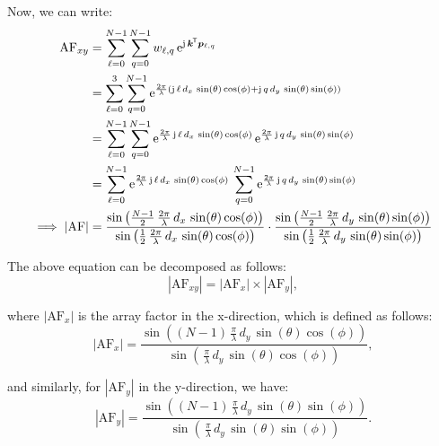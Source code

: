 \documentclass[12pt,onecolumn,a4paper]{article}
\newcommand*{\transpose}{{\mkern-1.5mu\mathsf{T}}}
\begin{document}
	Now, we can write:
\begin{align}
	\text{AF}_{xy} &= \sum_{\ell=0}^{N-1} \sum_{q=0}^{N-1} w_{\ell,q} \, \mathrm{e}^{\mathrm{j} \, \bm{k}^\transpose \bm{p}_{\ell,q}}\\
	&= \sum_{\ell=0}^{3} \sum_{q=0}^{N-1} \mathrm{e}^{\frac{2\pi}{\lambda} \left( \mathrm{j} \, \ell \, d_x \, \sin(\theta) \cos(\phi) + \mathrm{j} \, q \, d_y \, \sin(\theta) \sin(\phi) \right)} \\
	&= \sum_{\ell=0}^{N-1} \sum_{q=0}^{N-1} \mathrm{e}^{\frac{2\pi}{\lambda} \, \mathrm{j} \, \ell \, d_x \, \sin(\theta) \cos(\phi)} \, \mathrm{e}^{\frac{2\pi}{\lambda} \, \mathrm{j} \, q \, d_y \, \sin(\theta) \sin(\phi)} \\
	&= \sum_{\ell=0}^{N-1} \mathrm{e}^{\frac{2\pi}{\lambda} \, \mathrm{j} \, \ell \, d_x \, \sin(\theta) \cos(\phi)} \, \sum_{q=0}^{N-1} \mathrm{e}^{\frac{2\pi}{\lambda} \, \mathrm{j} \, q \, d_y \, \sin(\theta) \sin(\phi)} \\
	\implies |\text{AF}| &= 
	\frac{\sin \left( \frac{N-1}{2} \, \frac{2\pi}{\lambda} \, d_x \, \sin(\theta) \cos(\phi) \right)}
	{\sin \left( \frac{1}{2} \, \frac{2\pi}{\lambda} \, d_x \, \sin(\theta) \cos(\phi) \right)} 
	\cdot
	\frac{\sin \left( \frac{N-1}{2} \, \frac{2\pi}{\lambda} \, d_y \, \sin(\theta) \sin(\phi) \right)}
	{\sin \left( \frac{1}{2} \, \frac{2\pi}{\lambda} \, d_y \, \sin(\theta) \sin(\phi) \right)}
\end{align}

The above equation can be decomposed as follows:
	\begin{equation}
			|\text{AF}_{xy}| = |\text{AF}_x| \times |\text{AF}_y|,
	\end{equation}
	
where $|\text{AF}_x|$ is the array factor in the x-direction, which is defined as follows:
	\begin{equation}
		|\text{AF}_x| = 
		\frac{\sin \left( ({N-1}) \, \frac{\pi}{\lambda} \, d_y \, \sin(\theta) \cos(\phi) \right)}
		{\sin \left( \, \frac{\pi}{\lambda} \, d_y \, \sin(\theta) \cos(\phi) \right)},
	\end{equation}
	
	and similarly, for $|\text{AF}_y|$ in the y-direction, we have:
	\begin{equation}
		|\text{AF}_y| = 
		\frac{\sin \left( ({N-1}) \, \frac{\pi}{\lambda} \, d_y \, \sin(\theta) \sin(\phi) \right)}
		{\sin \left( \, \frac{\pi}{\lambda} \, d_y \, \sin(\theta) \sin(\phi) \right)}.
	\end{equation}
\end{document}
